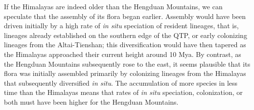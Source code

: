 



If the Himalayas are indeed older than the Hengduan Mountains, we can speculate that the assembly of its flora began earlier. Assembly would have been driven initially by a high rate of \textit{in situ} speciation of resident lineages, that is, lineages already established on the southern edge of the QTP, or early colonizing lineages from the Altai-Tienshan; this diversification would have then tapered as the Himalayas approached their current height around 10 Mya. By contrast, as the Hengduan Mountains subsequently rose to the east, it seems plausible that its flora was initially assembled primarily by colonizing lineages from the Himalayas that subsequently diversified \textit{in situ}. The accumulation of more species in less time than the Himalayas means that rates of \textit{in situ} speciation, colonization, or both must have been higher for the Hengduan Mountains.

